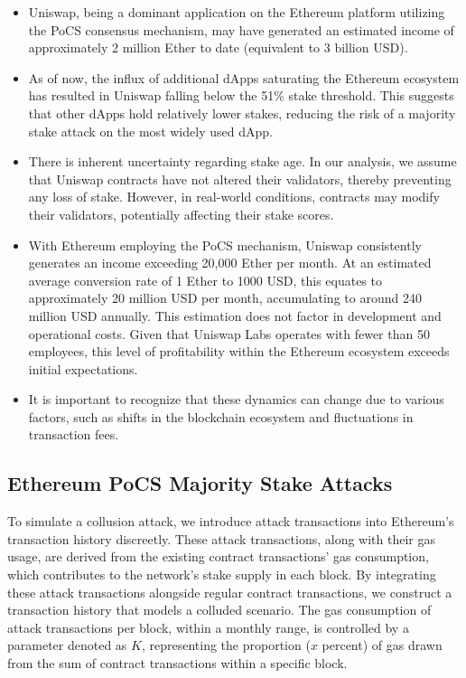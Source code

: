 \documentclass{article}
\begin{document}
\begin{itemize}
    \item Uniswap, being a dominant application on the Ethereum platform utilizing the PoCS consensus mechanism, may have generated an estimated income of approximately 2 million Ether to date (equivalent to 3 billion USD).
    \item As of now, the influx of additional dApps saturating the Ethereum ecosystem has resulted in Uniswap falling below the 51\% stake threshold. This suggests that other dApps hold relatively lower stakes, reducing the risk of a majority stake attack on the most widely used dApp.
    \item There is inherent uncertainty regarding stake age. In our analysis, we assume that Uniswap contracts have not altered their validators, thereby preventing any loss of stake. However, in real-world conditions, contracts may modify their validators, potentially affecting their stake scores.
    \item With Ethereum employing the PoCS mechanism, Uniswap consistently generates an income exceeding 20,000 Ether per month. At an estimated average conversion rate of 1 Ether to 1000 USD, this equates to approximately 20 million USD per month, accumulating to around 240 million USD annually. This estimation does not factor in development and operational costs. Given that Uniswap Labs operates with fewer than 50 employees, this level of profitability within the Ethereum ecosystem exceeds initial expectations.
    \item It is important to recognize that these dynamics can change due to various factors, such as shifts in the blockchain ecosystem and fluctuations in transaction fees.
\end{itemize}

\subsection{Ethereum PoCS Majority Stake Attacks}

To simulate a collusion attack, we introduce attack transactions into Ethereum’s transaction history discreetly. These attack transactions, along with their gas usage, are derived from the existing contract transactions’ gas consumption, which contributes to the network’s stake supply in each block. By integrating these attack transactions alongside regular contract transactions, we construct a transaction history that models a colluded scenario. The gas consumption of attack transactions per block, within a monthly range, is controlled by a parameter denoted as \( K \), representing the proportion (\( x \) percent) of gas drawn from the sum of contract transactions within a specific block.
\end{document}

